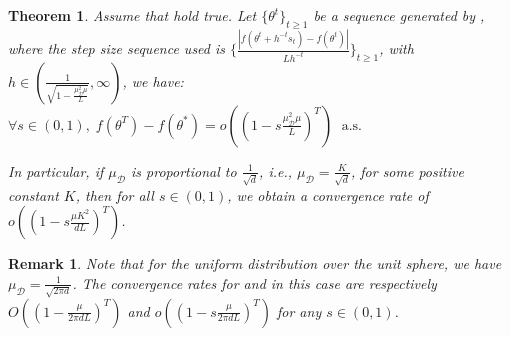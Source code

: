 \documentclass{article} %
\newtheorem{theorem}{Theorem}
\newtheorem{Remark}{Remark}
\begin{document}
\begin{theorem}\label{Thm6}
     Assume that  hold true. 
    Let  $\{\theta^t\}_{t \ge 1}$ be a sequence generated by , where the step size sequence used is $\{\frac{|f(\theta^t+h^{-t} s_t)-f(\theta^t) |}{L h^{-t}}\}_{t \ge 1}$, 
    with $h \in \left(\frac{1}{\sqrt{1-\frac{\mu_{\mathcal{D}}^2 \mu}{L}}}, \infty \right)$, we have: $\forall s \in (0,1),\;  f(\theta^T)-f(\theta^{*}) =o\left((1-  s \frac{\mu_{\mathcal{D}}^2 \mu }{L})^{T}\right)\; \text{ a.s.} $
     
In particular, if $\mu_{\mathcal{D}}$ is proportional to $\frac{1}{\sqrt{d}}$, i.e., $\mu_{\mathcal{D}} = \frac{K}{\sqrt{d}}$, for some positive constant $K$, then for all $s \in (0,1)$, %
we obtain a convergence rate of $o((1- s\frac{\mu K^2}{dL})^T)$. 
\end{theorem}

\begin{Remark}
Note that for the uniform distribution over the unit sphere, we have $\mu_{\mathcal{D}} = \frac{1}{\sqrt{2\pi d}}$. The convergence rates for  and  in this case are respectively $O((1 - \frac{\mu }{2\pi d L })^T)$ and $o((1 - s\frac{\mu }{2 \pi d L})^T)$ for any $s \in (0,1)$. 
\end{Remark}

\end{document}
